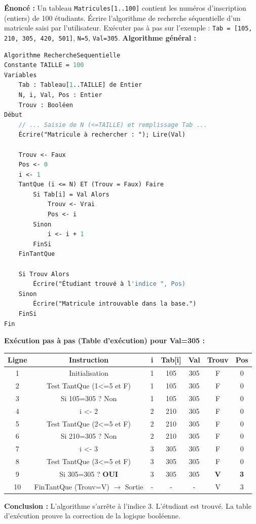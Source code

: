 \documentclass[11pt]{article}
\begin{document}
\begin{exoresolu}
\textbf{Énoncé :} Un tableau \texttt{Matricules[1..100]} contient les numéros d'inscription (entiers) de 100 étudiants. Écrire l'algorithme de recherche séquentielle d'un matricule saisi par l'utilisateur. Exécuter pas à pas sur l'exemple : \texttt{Tab = [105, 210, 305, 420, 501]}, \texttt{N=5}, \texttt{Val=305}.
\tcblower
\textbf{Algorithme général :}
\begin{lstlisting}[language=Pascal]
Algorithme RechercheSequentielle
Constante TAILLE = 100
Variables
    Tab : Tableau[1..TAILLE] de Entier
    N, i, Val, Pos : Entier
    Trouv : Booléen
Début
    // ... Saisie de N (<=TAILLE) et remplissage Tab ...
    Écrire("Matricule à rechercher : "); Lire(Val)

    Trouv <- Faux
    Pos <- 0
    i <- 1
    TantQue (i <= N) ET (Trouv = Faux) Faire
        Si Tab[i] = Val Alors
            Trouv <- Vrai
            Pos <- i
        Sinon
            i <- i + 1
        FinSi
    FinTantQue

    Si Trouv Alors
        Écrire("Étudiant trouvé à l'indice ", Pos)
    Sinon
        Écrire("Matricule introuvable dans la base.")
    FinSi
Fin
\end{lstlisting}
\medskip
\textbf{Exécution pas à pas (Table d'exécution) pour Val=305 :}
\begin{center}
\begin{tabular}{|c|c|c|c|c|c|c|}
\hline
\textbf{Ligne} & \textbf{Instruction} & \textbf{i} & \textbf{Tab[i]} & \textbf{Val} & \textbf{Trouv} & \textbf{Pos} \\
\hline
1 & Initialisation & 1 & 105 & 305 & F & 0 \\
2 & Test TantQue (1<=5 et F) & 1 & 105 & 305 & F & 0 \\
3 & Si 105=305 ? Non & 1 & 105 & 305 & F & 0 \\
4 & i <- 2 & 2 & 210 & 305 & F & 0 \\
5 & Test TantQue (2<=5 et F) & 2 & 210 & 305 & F & 0 \\
6 & Si 210=305 ? Non & 2 & 210 & 305 & F & 0 \\
7 & i <- 3 & 3 & 305 & 305 & F & 0 \\
8 & Test TantQue (3<=5 et F) & 3 & 305 & 305 & F & 0 \\
9 & Si 305=305 ? \textbf{OUI} & 3 & 305 & 305 & \textbf{V} & \textbf{3} \\
10 & FinTantQue (Trouv=V) $\rightarrow$ Sortie & - & - & - & V & 3 \\
\hline
\end{tabular}
\end{center}
\textbf{Conclusion :} L'algorithme s'arrête à l'indice 3. L'étudiant est trouvé. La table d'exécution prouve la correction de la logique booléenne.
\end{exoresolu}
\end{document}
